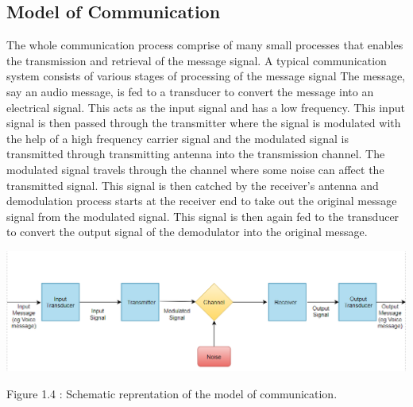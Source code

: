 \documentclass[12pt,a4paper]{article}%
\begin{document}
\begin{flushleft}
		\subsection{Model of Communication}
		\begin{flushleft}
			The whole communication process comprise of many small processes that enables the transmission and retrieval of the message signal. A typical communication system consists of various stages of processing of the message signal
			The message, say an audio message, is fed to a transducer to convert the message into an electrical signal. This acts as the input signal and has a low frequency. This input signal is then passed through the transmitter where the signal
			is modulated with the help of a high frequency carrier signal and the modulated signal is transmitted through transmitting antenna into the transmission channel. The modulated signal travels through the channel where some noise
			can affect the transmitted signal. This signal is then catched by the receiver's antenna and demodulation process starts at the receiver end to take out the original message signal from the modulated signal. This signal is then again 
			fed to the transducer to convert the output signal of the demodulator into the original message.
			\begin{center}
				{\includegraphics[width=0.80 \textwidth]{./images/modelofcomm.PNG}}
			\end{center}
			\begin{center}
				Figure 1.4 : Schematic reprentation of the model of communication.\\\bigskip
			\end{center}
		\end{flushleft}
		

\end{flushleft}
\end{document}
